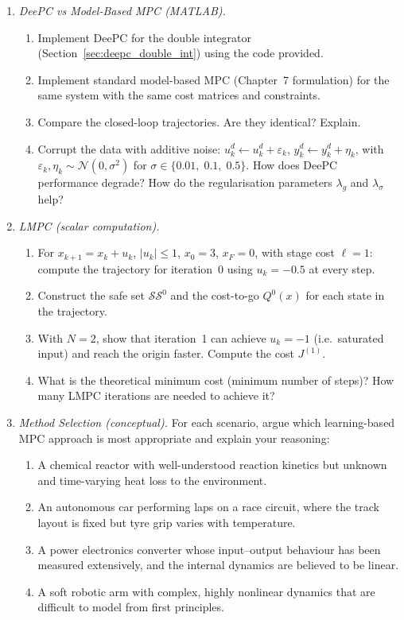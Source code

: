 \begin{enumerate}
	\item \emph{DeePC vs Model-Based MPC (MATLAB).}
	\begin{enumerate}
		\item Implement DeePC for the double integrator (Section~\ref{sec:deepc_double_int}) using the code provided.
		\item Implement standard model-based MPC (Chapter~7 formulation) for the same system with the same cost matrices and constraints.
		\item Compare the closed-loop trajectories. Are they identical? Explain.
		\item Corrupt the data with additive noise: $u_k^d \leftarrow u_k^d + \varepsilon_k$, $y_k^d \leftarrow y_k^d + \eta_k$, with $\varepsilon_k, \eta_k \sim \mathcal{N}(0, \sigma^2)$ for $\sigma \in \{0.01,\; 0.1,\; 0.5\}$. How does DeePC performance degrade? How do the regularisation parameters $\lambda_g$ and $\lambda_\sigma$ help?
	\end{enumerate}

	\item \emph{LMPC (scalar computation).}
	\begin{enumerate}
		\item For $x_{k+1} = x_k + u_k$, $|u_k| \le 1$, $x_0 = 3$, $x_F = 0$, with stage cost $\ell = 1$: compute the trajectory for iteration~0 using $u_k = -0.5$ at every step.
		\item Construct the safe set $\mathcal{SS}^0$ and the cost-to-go $Q^0(x)$ for each state in the trajectory.
		\item With $N = 2$, show that iteration~1 can achieve $u_k = -1$ (i.e.\ saturated input) and reach the origin faster. Compute the cost $J^{(1)}$.
		\item What is the theoretical minimum cost (minimum number of steps)? How many LMPC iterations are needed to achieve it?
	\end{enumerate}

	\item \emph{Method Selection (conceptual).} For each scenario, argue which learning-based MPC approach is most appropriate and explain your reasoning:
	\begin{enumerate}
		\item A chemical reactor with well-understood reaction kinetics but unknown and time-varying heat loss to the environment.
		\item An autonomous car performing laps on a race circuit, where the track layout is fixed but tyre grip varies with temperature.
		\item A power electronics converter whose input--output behaviour has been measured extensively, and the internal dynamics are believed to be linear.
		\item A soft robotic arm with complex, highly nonlinear dynamics that are difficult to model from first principles.
	\end{enumerate}
\end{enumerate}
